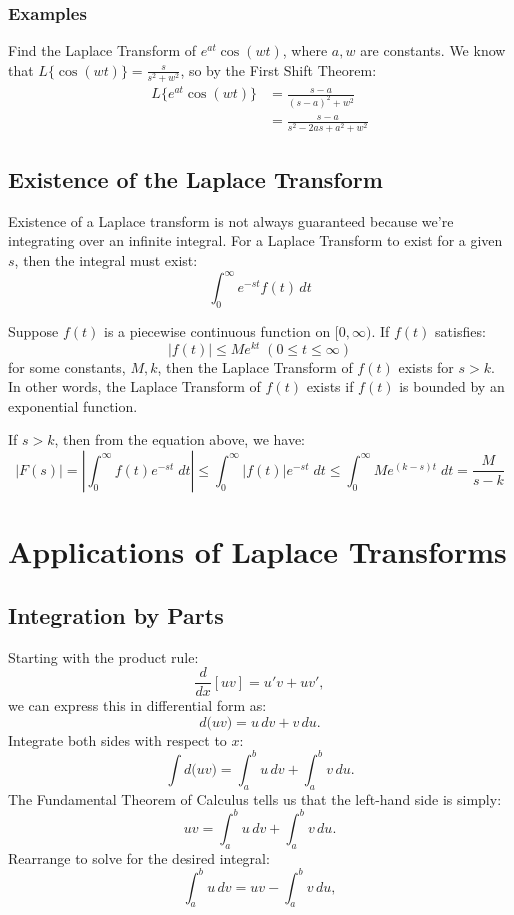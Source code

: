 \documentclass[a4paper, 10pt]{article}
\begin{document}
\subsubsection{Examples}
\begin{examplebox}{Find the Laplace Transform of $e^{at}\cos(wt)$, where $a,w$ are constants.}
  We know that $L\{\cos(wt)\} = \frac{s}{s^2 + w^2}$, so by the First Shift Theorem:
  \begin{align*}
    L\{e^{at}\cos(wt)\} & = \frac{s-a}{(s-a)^2 + w^2}         \\
                        & = \frac{s-a}{s^2 - 2as + a^2 + w^2}
  \end{align*}
\end{examplebox}
\subsection{Existence of the Laplace Transform}
Existence of a Laplace transform is not always guaranteed because we're integrating over an infinite integral. For a Laplace Transform to exist for a given $s$, then the integral must exist:
$$\int_0^\infty e^{-st}f(t)\, dt$$

\begin{theorembox}
  Suppose $f(t)$ is a piecewise continuous function on $[0,\infty)$. If $f(t)$ satisfies:
  $$|f(t)| \leq Me^{kt} \; (0 \leq t \leq \infty)$$
  for some constants, $M, k$, then the Laplace Transform of $f(t)$ exists for $s > k$. In other words, the Laplace Transform of $f(t)$ exists if $f(t)$ is bounded by an exponential function.
\end{theorembox}

\begin{proofbox}
  If $s > k$, then from the equation above, we have:
  $$|F(s)| = \left | \int_0^\infty f(t)e^{-st} \; dt  \right | \leq \int_{0}^{\infty} |f(t)| e^{-st} \; dt \leq \int_{0}^\infty Me^{(k-s)t} \; dt = \frac{M}{s-k}$$
\end{proofbox}

\section{Applications of Laplace Transforms}
\subsection{Integration by Parts}
Starting with the product rule:
$$
  \frac{d}{dx}[uv] = u'v + uv',
$$
we can express this in differential form as:
$$
  d\bigl(uv\bigr) = u\,dv + v\,du.
$$
Integrate both sides with respect to \(x\):
$$
  \int d\bigl(uv\bigr) = \int_a^b u\,dv + \int_a^b v\,du.
$$
The Fundamental Theorem of Calculus tells us that the left-hand side is simply:
$$
  uv = \int_a^b u\,dv + \int_a^b v\,du.
$$
Rearrange to solve for the desired integral:
$$
  \int_a^b u\,dv = uv - \int_a^b v\,du,
$$
\end{document}
